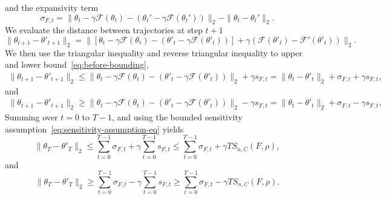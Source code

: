 \documentclass[twoside,11pt]{article}
\newcommand{\F}{\mathcal{F}}
\begin{document}
    and the expansivity term 
    \begin{equation*}
        \sigma_{F, t} = \| \theta_t - \gamma \F(\theta_t) - (\theta_t' - \gamma \F(\theta_t')) \|_2  - \| \theta_t - \theta_t' \|_2.
    \end{equation*}
    We evaluate the distance between trajectories at step $t+1$
    \begin{equation}\label{eq:before-bounding}
        \| \theta_{t+1} - \theta'_{t+1} \|_2 
        = \| [\theta_t - \gamma \F(\theta_t) - (\theta'_t - \gamma \F(\theta'_t))] + \gamma(\F(\theta'_t) - \F'(\theta'_t)) \|_2.
    \end{equation}
    We then use the triangular inequality and reverse triangular inequality to upper and lower bound~\eqref{eq:before-bounding},
    \begin{align*}
        \| \theta_{t+1} - \theta'_{t+1} \|_2 
        \leq \| \theta_t - \gamma \F(\theta_t) - (\theta'_t - \gamma \F(\theta'_t)) \|_2 + \gamma s_{F,t} 
        = \| \theta_t - \theta'_t \|_2 + \sigma_{F,t} + \gamma s_{F,t},
    \end{align*}
    and
    \begin{align*}
        \| \theta_{t+1} - \theta'_{t+1} \|_2 
        \geq \| \theta_t - \gamma \F(\theta_t) - (\theta'_t - \gamma \F(\theta'_t)) \|_2 - \gamma s_{F,t}
        = \| \theta_t - \theta'_t \|_2 + \sigma_{F,t} - \gamma s_{F,t},
    \end{align*}
    Summing over $t=0$ to $T-1$, and using the bounded sensitivity assumption~\eqref{eq:sensitivity-assumption-eq} yields
    \begin{equation}\label{eq:telescoping_traj_ub}
        \| \theta_T - \theta'_T \|_2 
        \leq \sum_{t=0}^{T-1} \sigma_{F,t} + \gamma \sum_{t=0}^{T-1} s_{F,t}
        \leq \sum_{t=0}^{T-1} \sigma_{F,t} + \gamma T S_{n, C}(F, \rho),
    \end{equation}
    and 
    \begin{equation}\label{eq:telescoping_traj}
        \| \theta_T - \theta'_T \|_2 
        \geq \sum_{t=0}^{T-1} \sigma_{F,t} - \gamma \sum_{t=0}^{T-1} s_{F,t}
        \geq \sum_{t=0}^{T-1} \sigma_{F,t} - \gamma T S_{n, C}(F, \rho).
    \end{equation}
\end{document}
